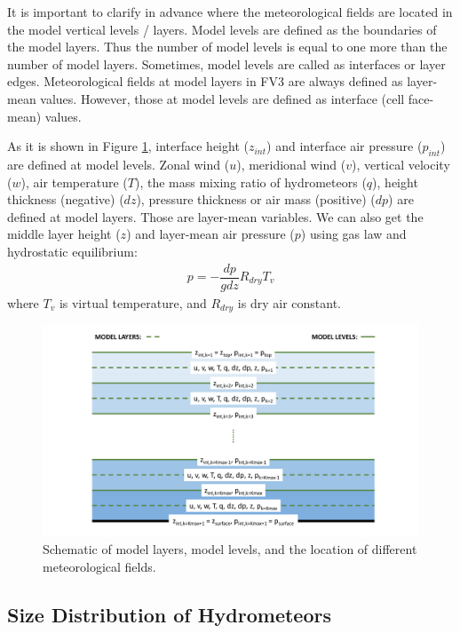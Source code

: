 \documentclass[letterpaper,titlepage,10pt]{article}
\numberwithin{equation}{section}
\begin{document}
It is important to clarify in advance where the meteorological fields are located in the model vertical levels / layers. Model levels are defined as the boundaries of the model layers. Thus the number of model levels is equal to one more than the number of model layers. Sometimes, model levels are called as interfaces or layer edges. Meteorological fields at model layers in FV3 are always defined as layer-mean values. However, those at model levels are defined as interface (cell face-mean) values.

As it is shown in Figure \ref{fig:fig2}, interface height ($z_{int}$) and interface air pressure ($p_{int}$) are defined at model levels. Zonal wind ($u$), meridional wind ($v$), vertical velocity ($w$), air temperature ($T$), the mass mixing ratio of hydrometeors ($q$), height thickness (negative) ($dz$), pressure thickness or air mass (positive) ($dp$) are defined at model layers. Those are layer-mean variables. We can also get the middle layer height ($z$) and layer-mean air pressure ($p$) using gas law and hydrostatic equilibrium:
\begin{gather}
	p = - \dfrac{dp}{gdz} R_{dry} T_v
\end{gather}
where $T_v$ is virtual temperature, and $R_{dry}$ is dry air constant.

\begin{figure}[h]
\centering
\includegraphics[width=\textwidth]{fig2.pdf}
\caption{Schematic of model layers, model levels, and the location of different meteorological fields.}
\label{fig:fig2}
\end{figure}


\subsection{Size Distribution of Hydrometeors}
\end{document}
